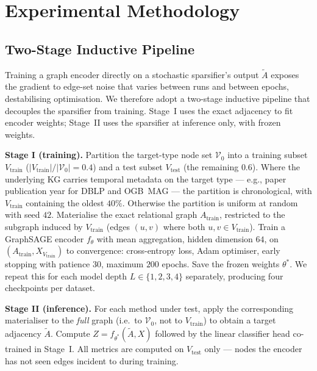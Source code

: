 \documentclass[sigconf]{acmart}
\begin{document}
\section{Experimental Methodology}
\label{sec:methodology}

\sloppy

\subsection{Two-Stage Inductive Pipeline}
\label{sec:methodology-protocol}

Training a graph encoder directly on a stochastic sparsifier's output $\widetilde{A}$ exposes the gradient to edge-set noise that varies between runs and between epochs, destabilising optimisation. We therefore adopt a two-stage inductive pipeline that decouples the sparsifier from training. Stage~I uses the exact adjacency to fit encoder weights; Stage~II uses the sparsifier at inference only, with frozen weights.

\textbf{Stage I (training).} Partition the target-type node set $\mathcal{V}_0$ into a training subset $V_\text{train}$ ($|V_\text{train}|/|\mathcal{V}_0|=0.4$) and a test subset $V_\text{test}$ (the remaining $0.6$). Where the underlying KG carries temporal metadata on the target type --- e.g., paper publication year for DBLP and OGB~MAG --- the partition is chronological, with $V_\text{train}$ containing the oldest $40\%$. Otherwise the partition is uniform at random with seed $42$. Materialise the exact relational graph $A_\text{train}$, restricted to the subgraph induced by $V_\text{train}$ (edges $(u,v)$ where both $u,v\in V_\text{train}$). Train a GraphSAGE encoder $f_\theta$ with mean aggregation, hidden dimension $64$, on $(A_\text{train}, X_{V_\text{train}})$ to convergence: cross-entropy loss, Adam optimiser, early stopping with patience $30$, maximum $200$ epochs. Save the frozen weights $\theta^*$. We repeat this for each model depth $L \in \{1,2,3,4\}$ separately, producing four checkpoints per dataset.

\textbf{Stage II (inference).} For each method under test, apply the corresponding materialiser to the \emph{full} graph (i.e.\ to $\mathcal{V}_0$, not to $V_\text{train}$) to obtain a target adjacency $\widetilde{A}$. Compute $Z = f_{\theta^*}(\widetilde{A}, X)$ followed by the linear classifier head co-trained in Stage~I. All metrics are computed on $V_\text{test}$ only --- nodes the encoder has not seen edges incident to during training.
\end{document}
